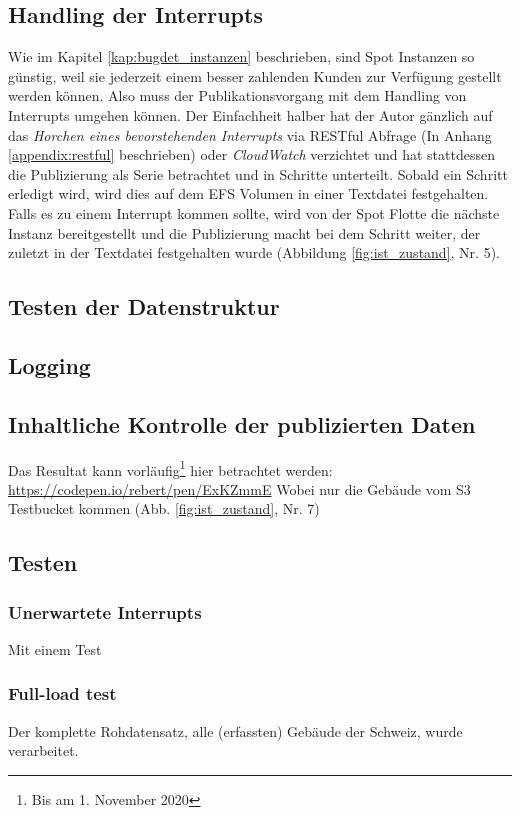 \subsection{Handling der Interrupts}
Wie im Kapitel \ref{kap:bugdet_instanzen} beschrieben, sind Spot Instanzen so günstig, weil sie jederzeit einem besser zahlenden Kunden zur Verfügung gestellt werden können. Also muss der Publikationsvorgang mit dem Handling von Interrupts umgehen können. 
Der Einfachheit halber hat der Autor gänzlich auf das \textit{Horchen eines bevorstehenden Interrupts} via RESTful Abfrage (In Anhang \ref{appendix:restful} beschrieben) oder \emph{CloudWatch} verzichtet und hat stattdessen die Publizierung als Serie betrachtet und in Schritte unterteilt. Sobald ein Schritt erledigt wird, wird dies auf dem EFS Volumen in einer Textdatei festgehalten. Falls es zu einem Interrupt kommen sollte, wird von der Spot Flotte die nächste Instanz bereitgestellt und die Publizierung macht bei dem Schritt weiter, der zuletzt in der Textdatei festgehalten wurde (Abbildung \ref{fig:ist_zustand}, Nr. 5).

\subsection{Testen der Datenstruktur}

\subsection{Logging}


\subsection{Inhaltliche Kontrolle der publizierten Daten}
Das Resultat kann vorläufig\footnote{Bis am 1. November 2020} hier betrachtet werden:
\href{https://codepen.io/rebert/pen/ExKZmmE}{https://codepen.io/rebert/pen/ExKZmmE} Wobei nur die Gebäude vom S3 Testbucket kommen (Abb. \ref{fig:ist_zustand}, Nr. 7) 

\subsection{Testen}

\subsubsection{Unerwartete Interrupts}
Mit einem Test


\subsubsection{Full-load test}
Der komplette Rohdatensatz, alle (erfassten) Gebäude der Schweiz, wurde verarbeitet. 

